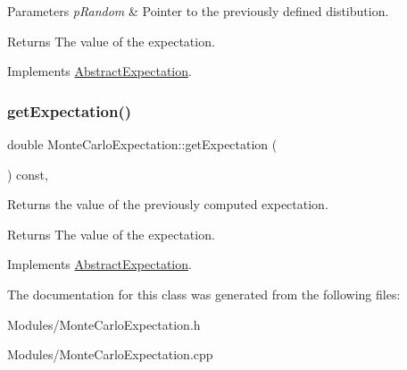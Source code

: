 \begin{DoxyParams}{Parameters}
{\em p\+Random} & Pointer to the previously defined distibution. \\
\hline
\end{DoxyParams}
\begin{DoxyReturn}{Returns}
The value of the expectation. 
\end{DoxyReturn}


Implements \hyperlink{classAbstractExpectation_a3f3bc9fdcbd4856212857fc0fa4445a5}{Abstract\+Expectation}.

\mbox{\label{classMonteCarloExpectation_a0cadc5362ae4d9073f4131ed9208053c}} 
\subsubsection{\texorpdfstring{get\+Expectation()}{getExpectation()}}
{\footnotesize\ttfamily double Monte\+Carlo\+Expectation\+::get\+Expectation (\begin{DoxyParamCaption}{ }\end{DoxyParamCaption}) const\hspace{0.3cm}{\ttfamily [inline]}, {\ttfamily [virtual]}}



Returns the value of the previously computed expectation. 

\begin{DoxyReturn}{Returns}
The value of the expectation. 
\end{DoxyReturn}


Implements \hyperlink{classAbstractExpectation_a256d47c871d941e081a17194dda4d774}{Abstract\+Expectation}.



The documentation for this class was generated from the following files\+:\begin{DoxyCompactItemize}
\item 
Modules/Monte\+Carlo\+Expectation.\+h\item 
Modules/Monte\+Carlo\+Expectation.\+cpp\end{DoxyCompactItemize}

